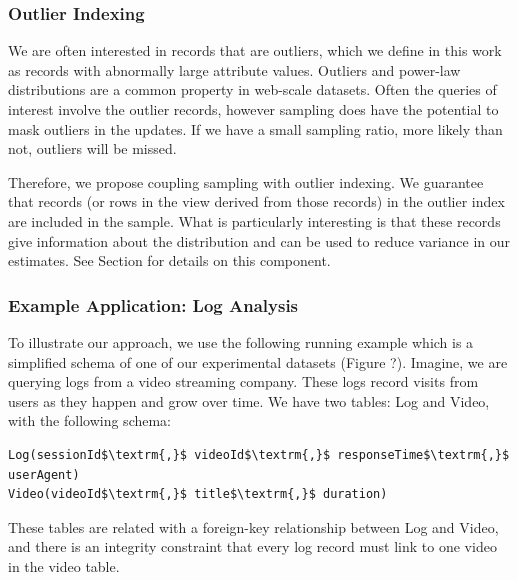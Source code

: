 \subsubsection{Outlier Indexing}
We are often interested in records that are outliers, 
which we define in this work as records with abnormally large attribute values.
Outliers and power-law distributions are a common property in web-scale datasets.
Often the queries of interest involve the outlier records, however sampling does 
have the potential to mask outliers in the updates.
If we have a small sampling ratio, more likely than not, outliers will be missed.

Therefore, we propose coupling sampling with outlier indexing. 
We guarantee that records (or rows in the view derived from those records) 
in the outlier index are included in the sample.
What is particularly interesting is that these records give information about the distribution 
and can be used to reduce variance in our estimates.
See Section \label{outlier} for details on this component.

\subsubsection{Example Application: Log Analysis}
To illustrate our approach, we use the following running example which is a 
simplified schema of one of our experimental datasets (Figure ?).
Imagine, we are querying logs from a video streaming company. 
These logs record visits from users as they happen and grow over time.
We have two tables: Log and Video, with the following schema:

\begin{lstlisting}[mathescape]
Log(sessionId$\textrm{,}$ videoId$\textrm{,}$ responseTime$\textrm{,}$ userAgent)
Video(videoId$\textrm{,}$ title$\textrm{,}$ duration)
\end{lstlisting}
These tables are related with a foreign-key relationship between
Log and Video, and there is an integrity constraint that every log
record must link to one video in the video table.

